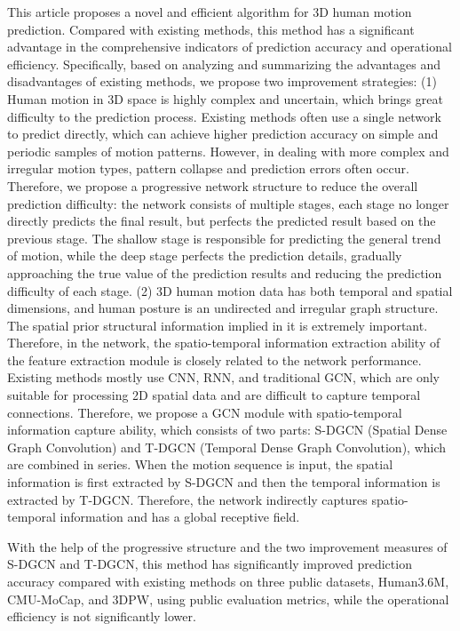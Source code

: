 This article proposes a novel and efficient algorithm for 3D human motion prediction. Compared with existing methods, this method has a significant advantage in the comprehensive indicators of prediction accuracy and operational efficiency. Specifically, based on analyzing and summarizing the advantages and disadvantages of existing methods, we propose two improvement strategies: (1) Human motion in 3D space is highly complex and uncertain, which brings great difficulty to the prediction process. Existing methods often use a single network to predict directly, which can achieve higher prediction accuracy on simple and periodic samples of motion patterns. However, in dealing with more complex and irregular motion types, pattern collapse and prediction errors often occur. Therefore, we propose a progressive network structure to reduce the overall prediction difficulty: the network consists of multiple stages, each stage no longer directly predicts the final result, but perfects the predicted result based on the previous stage. The shallow stage is responsible for predicting the general trend of motion, while the deep stage perfects the prediction details, gradually approaching the true value of the prediction results and reducing the prediction difficulty of each stage. (2) 3D human motion data has both temporal and spatial dimensions, and human posture is an undirected and irregular graph structure. The spatial prior structural information implied in it is extremely important. Therefore, in the network, the spatio-temporal information extraction ability of the feature extraction module is closely related to the network performance. Existing methods mostly use CNN, RNN, and traditional GCN, which are only suitable for processing 2D spatial data and are difficult to capture temporal connections. Therefore, we propose a GCN module with spatio-temporal information capture ability, which consists of two parts: S-DGCN (Spatial Dense Graph Convolution) and T-DGCN (Temporal Dense Graph Convolution), which are combined in series. When the motion sequence is input, the spatial information is first extracted by S-DGCN and then the temporal information is extracted by T-DGCN. Therefore, the network indirectly captures spatio-temporal information and has a global receptive field.

With the help of the progressive structure and the two improvement measures of S-DGCN and T-DGCN, this method has significantly improved prediction accuracy compared with existing methods on three public datasets, Human3.6M, CMU-MoCap, and 3DPW, using public evaluation metrics, while the operational efficiency is not significantly lower.

